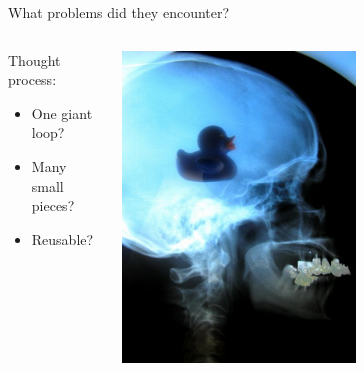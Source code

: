 \documentclass[aspectratio=43]{beamer}
\begin{document}
\begin{frame}{What problems did they encounter?}
\begin{columns}
	\begin{column}{0.55\textwidth}
Thought process:
		\begin{itemize}
			\item One giant loop?
                        \item Many small pieces?
                        \item Reusable? 
		\end{itemize} 
        \end{column} 
        \begin{column}{0.45\textwidth} 
          \centering 
          \includegraphics[width=0.6\textwidth]{fig/duckie-brain.jpg} 
        \end{column}
\end{columns}

\end{frame}
\end{document}
